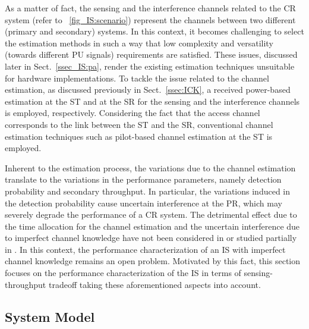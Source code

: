 As a matter of fact, the sensing and the interference channels related to the CR system (refer to \figurename~\ref{fig_IS:scenario}) represent the channels between two different (primary and secondary) systems. In this context, it becomes challenging to select the estimation methods in such a way that low complexity and versatility (towards different PU signals) requirements are satisfied. These issues, discussed later in Sect.~\ref{ssec_IS:pa}, render the existing estimation techniques \cite{Stoica03, Gifford05, Gifford08, Chav11, Sharma13} unsuitable for hardware implementations.
To tackle the issue related to the channel estimation, as discussed previously in Sect.~\ref{ssec:ICK}, a received power-based estimation at the ST and at the SR for the sensing and the interference channels is employed, respectively.
Considering the fact that the access channel corresponds to the link between the ST and the SR, conventional channel estimation techniques such as pilot-based channel estimation at the ST is employed.

Inherent to the estimation process, the variations due to the channel estimation translate to the variations in the performance parameters, namely detection probability and secondary throughput. In particular, the variations induced in the detection probability cause uncertain interference at the PR, which may severely degrade the performance of a CR system. The detrimental effect due to the time allocation for the channel estimation and the uncertain interference due to imperfect channel knowledge have not been considered in \cite{Liang08, Juarez11} or studied partially in \cite{Chav11, Cao14}. In this context, the performance characterization of an IS with imperfect channel knowledge remains an open problem.
Motivated by this fact, this section focuses on the performance characterization of the IS in terms of sensing-throughput tradeoff taking these aforementioned aspects into account.


\subsection{System Model} \label{sec_IS:sys_mod}
